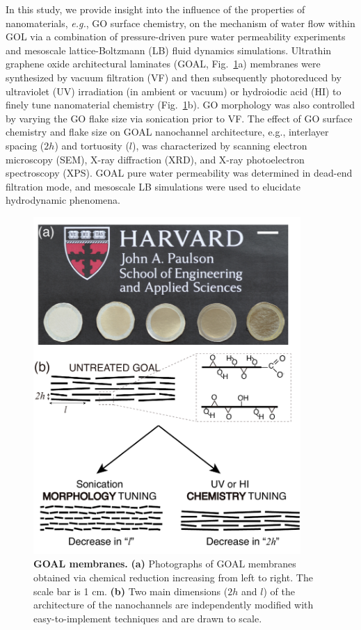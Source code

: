 In this study, we provide insight into the influence of the properties of nanomaterials, \textit{e.g.}, GO surface chemistry, on the mechanism of water flow within GOL via a combination of
pressure-driven pure water permeability experiments and mesoscale lattice-Boltzmann (LB) fluid dynamics simulations. Ultrathin graphene oxide architectural laminates (GOAL, Fig.~\ref{Fig1_pap4}a) membranes were synthesized by vacuum filtration (VF) and then subsequently photoreduced by ultraviolet (UV) irradiation (in ambient or vacuum) or hydroiodic acid (HI) to finely tune nanomaterial chemistry (Fig.~\ref{Fig1_pap4}b). GO morphology was also controlled by varying the GO flake size via sonication prior to VF. The effect of GO surface chemistry and flake size on GOAL nanochannel architecture, e.g., interlayer spacing ($2h$) and tortuosity ($l$), was characterized by scanning electron microscopy (SEM), X-ray diffraction (XRD), and X-ray photoelectron spectroscopy (XPS). GOAL pure water permeability was determined in dead-end filtration mode, and mesoscale LB simulations were used to elucidate hydrodynamic phenomena.

\begin{figure}[t!]
  \centering
  \includegraphics[width=4in]{paper4/Fig1.pdf}
  \caption{\textbf{GOAL membranes.} \textbf{(a)} Photographs of GOAL membranes obtained via chemical reduction increasing from left to right. The scale bar is 1 cm. \textbf{(b)} Two main dimensions ($2h$ and $l$) of the architecture of the nanochannels are independently modified with easy-to-implement techniques and are drawn to scale.}
  \label{Fig1_pap4}
\end{figure}


